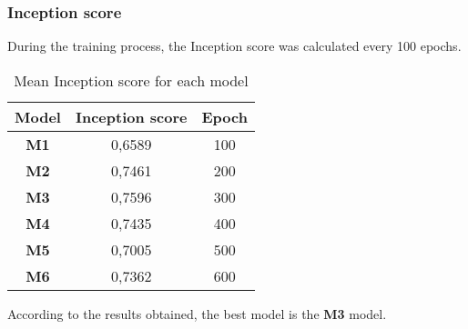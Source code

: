 \subsubsection{Inception score}
During the training process, the Inception score was calculated every 100 epochs.
\begin{table}[H]
    \centering
    \begin{tabular}{|c|c|c|}
        \hline
        \textbf{Model} & \textbf{Inception score} & \textbf{Epoch} \\
        \hline
        \hline
        \textbf{M1} & 0,6589 & 100 \\
        \hline
        \textbf{M2} & 0,7461 & 200 \\
        \hline
        \textbf{M3} & 0,7596 & 300 \\
        \hline
        \textbf{M4} & 0,7435 & 400 \\
        \hline
        \textbf{M5} & 0,7005 & 500 \\
        \hline
        \textbf{M6} & 0,7362 & 600 \\
    \end{tabular}
    \caption{Mean Inception score for each model}
    \label{tab:inception-score}
\end{table}
According to the results obtained, the best model is the \textbf{M3} model.

